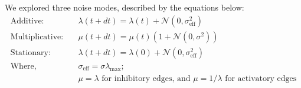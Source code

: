 \documentclass[11pt]{article}
\providecommand{\DIFaddbegin}{} %
\providecommand{\DIFaddend}{} %
\providecommand{\DIFdelbegin}{} %
\providecommand{\DIFdelend}{} %
\providecommand{\DIFscaledelfig}{0.5}
\newlength{\DIFdelgraphicswidth} %
\newlength{\DIFdelgraphicsheight} %
\providecommand{\DIFaddincludegraphics}[2][]{{\color{blue}\fbox{\DIFOincludegraphics[#1]{#2}}}} %
\providecommand{\DIFdelincludegraphics}[2][]{%
\sbox{\DIFdelgraphicsbox}{\DIFOincludegraphics[#1]{#2}}%
\settoboxwidth{\DIFdelgraphicswidth}{\DIFdelgraphicsbox} %
\settoboxtotalheight{\DIFdelgraphicsheight}{\DIFdelgraphicsbox} %
\scalebox{\DIFscaledelfig}{%
\parbox[b]{\DIFdelgraphicswidth}{\usebox{\DIFdelgraphicsbox}\\[-\baselineskip] \rule{\DIFdelgraphicswidth}{0em}}\llap{\resizebox{\DIFdelgraphicswidth}{\DIFdelgraphicsheight}{%
\setlength{\unitlength}{\DIFdelgraphicswidth}%
\begin{picture}(1,1)%
\thicklines\linethickness{2pt} %
{\color[rgb]{1,0,0}\put(0,0){\framebox(1,1){}}}%
{\color[rgb]{1,0,0}\put(0,0){\line( 1,1){1}}}%
{\color[rgb]{1,0,0}\put(0,1){\line(1,-1){1}}}%
\end{picture}%
}\hspace*{3pt}}} %
} %
\DeclareRobustCommand{\DIFaddbegin}{\DIFOaddbegin \let\includegraphics\DIFaddincludegraphics} %
\DeclareRobustCommand{\DIFaddend}{\DIFOaddend \let\includegraphics\DIFOincludegraphics} %
\DeclareRobustCommand{\DIFdelbegin}{\DIFOdelbegin \let\includegraphics\DIFdelincludegraphics} %
\DeclareRobustCommand{\DIFdelend}{\DIFOaddend \let\includegraphics\DIFOincludegraphics} %
\begin{document}
We explored three noise modes, described by the equations below: 
\begin{equation}
\DIFdelbegin %
\DIFdelend \DIFaddbegin \begin{aligned}
\text{Additive:} \quad & \lambda(t+dt) = \lambda(t) + \mathcal{N}(0, \sigma_{\text{eff}}^2) \\
\text{Multiplicative:} \quad & \mu(t+dt) = \mu(t)\left(1 + \mathcal{N}(0, \sigma^2)\right) \\
\text{Stationary:} \quad & \lambda(t+dt) = \lambda(0) + \mathcal{N}(0, \sigma_{\text{eff}}^2) \\
\text{Where,} \quad & \sigma_{\text{eff}} = \sigma\lambda_{\text{max}}\text{;} \\
& \mu = \lambda \text{ for inhibitory edges, and } \mu = 1/\lambda \text{ for activatory edges}
\end{aligned}\DIFaddend 
\label{eq:lambda}
\end{equation}
\end{document}
